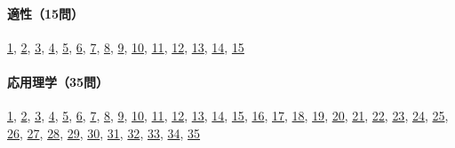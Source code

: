 \paragraph{適性（15問）} \hyperref[q:r07-reg-apt-01]{1}, \hyperref[q:r07-reg-apt-02]{2}, \hyperref[q:r07-reg-apt-03]{3}, \hyperref[q:r07-reg-apt-04]{4}, \hyperref[q:r07-reg-apt-05]{5}, \hyperref[q:r07-reg-apt-06]{6}, \hyperref[q:r07-reg-apt-07]{7}, \hyperref[q:r07-reg-apt-08]{8}, \hyperref[q:r07-reg-apt-09]{9}, \hyperref[q:r07-reg-apt-10]{10}, \hyperref[q:r07-reg-apt-11]{11}, \hyperref[q:r07-reg-apt-12]{12}, \hyperref[q:r07-reg-apt-13]{13}, \hyperref[q:r07-reg-apt-14]{14}, \hyperref[q:r07-reg-apt-15]{15}
\paragraph{応用理学（35問）} \hyperref[q:r07-reg-applied-01]{1}, \hyperref[q:r07-reg-applied-02]{2}, \hyperref[q:r07-reg-applied-03]{3}, \hyperref[q:r07-reg-applied-04]{4}, \hyperref[q:r07-reg-applied-05]{5}, \hyperref[q:r07-reg-applied-06]{6}, \hyperref[q:r07-reg-applied-07]{7}, \hyperref[q:r07-reg-applied-08]{8}, \hyperref[q:r07-reg-applied-09]{9}, \hyperref[q:r07-reg-applied-10]{10}, \hyperref[q:r07-reg-applied-11]{11}, \hyperref[q:r07-reg-applied-12]{12}, \hyperref[q:r07-reg-applied-13]{13}, \hyperref[q:r07-reg-applied-14]{14}, \hyperref[q:r07-reg-applied-15]{15}, \hyperref[q:r07-reg-applied-16]{16}, \hyperref[q:r07-reg-applied-17]{17}, \hyperref[q:r07-reg-applied-18]{18}, \hyperref[q:r07-reg-applied-19]{19}, \hyperref[q:r07-reg-applied-20]{20}, \hyperref[q:r07-reg-applied-21]{21}, \hyperref[q:r07-reg-applied-22]{22}, \hyperref[q:r07-reg-applied-23]{23}, \hyperref[q:r07-reg-applied-24]{24}, \hyperref[q:r07-reg-applied-25]{25}, \hyperref[q:r07-reg-applied-26]{26}, \hyperref[q:r07-reg-applied-27]{27}, \hyperref[q:r07-reg-applied-28]{28}, \hyperref[q:r07-reg-applied-29]{29}, \hyperref[q:r07-reg-applied-30]{30}, \hyperref[q:r07-reg-applied-31]{31}, \hyperref[q:r07-reg-applied-32]{32}, \hyperref[q:r07-reg-applied-33]{33}, \hyperref[q:r07-reg-applied-34]{34}, \hyperref[q:r07-reg-applied-35]{35}

